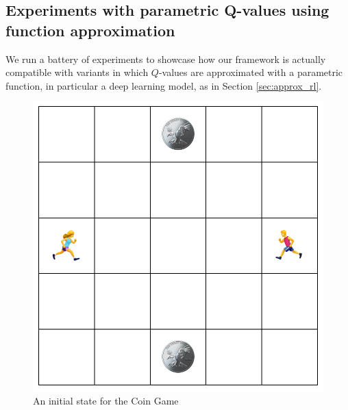 





\subsection{Experiments with parametric Q-values using function approximation}\label{sec:cg}

We run a battery of experiments to showcase 
how our framework is actually compatible with variants in which $Q$-values are approximated with a parametric function, in particular a deep learning model, as in Section \ref{sec:approx_rl}.

\begin{figure}[h]
\centering
\includegraphics[scale=0.3]{figures/game5x5.png}%
\caption{An initial state for the Coin Game}\label{fig:coingame}
\end{figure}

